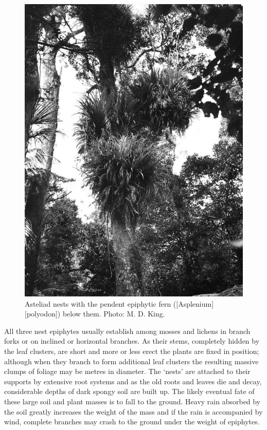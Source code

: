 \begin{figure}[t]
\begin{minipage}[t]{\textwidth}
\begin{minipage}[t]{(\textwidth-\fgap) * \real{0.446}}
			\label{fig:39kahikatea}
		\end{minipage}\hspace{\fgap}%
		\begin{minipage}[t]{(\textwidth-\fgap) * \real{0.554}}
			\centering
			\includegraphics[width=\textwidth]{graphics/fig_040}
			\caption[Asteliad nests with the pendent epiphytic fern \emph{Asplenium polyodon}]{Asteliad nests with the pendent epiphytic fern  ([Asplenium][polyodon]) below them.
			Photo: M. D. King.}%
			\label{fig:40asteliad}
		\end{minipage}
	\end{minipage}
\end{figure}

All three nest epiphytes usually establish among mosses and lichens in branch forks or on inclined or horizontal branches.
As their stems, completely hidden by the leaf clusters, are short and more or less erect the plants are fixed in position; although when they branch to form additional leaf clusters the resulting massive clumps of foliage may be metres in diameter.
The `nests' are attached to their supports by extensive root systems and as the old roots and leaves die and decay, considerable depths of dark spongy soil are built up.
The likely eventual fate of these large soil and plant masses is to fall to the ground.
Heavy rain absorbed by the soil greatly increases the weight of the mass and if the rain is accompanied by wind, complete branches may crash to the ground under the weight of epiphytes.

